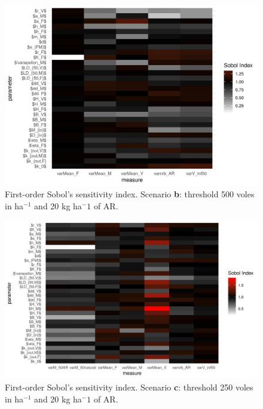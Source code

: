 \documentclass[11pt]{article}
\begin{document}
\begin{figure}[!htb]
	\begin{center}
		\includegraphics[width=\linewidth]{img/plt_sobolIndex_500_20.png}
		\caption{First-order Sobol's sensitivity index. Scenario \textbf{b}: threshold 500 voles in ha$^{-1}$ and 20 kg ha$^-1$ of AR.}
	\end{center}
\end{figure}


\begin{figure}[!htb]
	\begin{center}
		\includegraphics[width=\linewidth]{img/plt_sobolIndex_250_20.png}
		\caption{First-order Sobol's sensitivity index. Scenario \textbf{c}: threshold 250 voles in ha$^{-1}$ and 20 kg ha$^-1$ of AR.}
	\end{center}
\end{figure}
\end{document}
